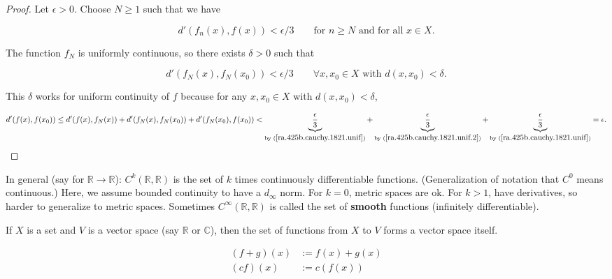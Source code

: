 \begin{proof}

Let \(\epsilon > 0\). Choose \(N \geq 1\) such that we have 

\begin{equation}\label{ra.425b.cauchy.1821.unif}
d'(f_n(x), f(x)) < \epsilon/3 \qquad \text{for } n \geq N \text{ and for all } x \in X.
\end{equation} 

The function \(f_N\) is uniformly continuous, so there exists \(\delta >0 \) such that

\begin{equation}\label{ra.425b.cauchy.1821.unif.2}
d'(f_N(x), f_N(x_0)) < \epsilon/3  \qquad  \forall x, x_0 \in X \text{ with } d(x, x_0) < \delta.
\end{equation} 

This \(\delta\) works for uniform continuity of \(f\) because for any \(x , x_0 \in X\) with \(d(x, x_0) < \delta\),

\[
d'(f(x), f(x_0)) \leq d'(f(x), f_N(x)) + d' (f_N(x), f_N(x_0)) + d' (f_N(x_0), f(x_0)) < \underbrace{\frac{\epsilon}{3}}_{\text{by }(\ref{ra.425b.cauchy.1821.unif})} + \underbrace{\frac{\epsilon}{3}}_{\text{by }(\ref{ra.425b.cauchy.1821.unif.2})}  + \underbrace{\frac{\epsilon}{3}}_{\text{by }(\ref{ra.425b.cauchy.1821.unif})}  = \epsilon.
\]

\end{proof}



\begin{definition}[\(C^k(X,Y)\)]

In general (say for \(\mathbb{R} \to \mathbb{R}\)): \(C^k(\mathbb{R}, \mathbb{R}) \) is the set of \(k \) times continuously differentiable functions. (Generalization of notation that \(C^0\) means continuous.) Here, we assume bounded continuity to have a \(d_\infty\) norm. For \(k=0\), metric spaces are ok. For \(k > 1\), have derivatives, so harder to generalize to metric spaces. Sometimes \(C^\infty(\mathbb{R}, \mathbb{R})\) is called the set of \textbf{smooth} functions (infinitely differentiable).

\end{definition}

If \(X\) is a set and \(V\) is a vector space (say \(\mathbb{R}\) or \(\mathbb{C}\)), then the set of functions from \(X\) to \(V\) forms a vector space itself. 

\begin{align*}
(f+g)(x) & := f(x) + g(x) \\
(cf)(x) & := c(f(x))
\end{align*}

